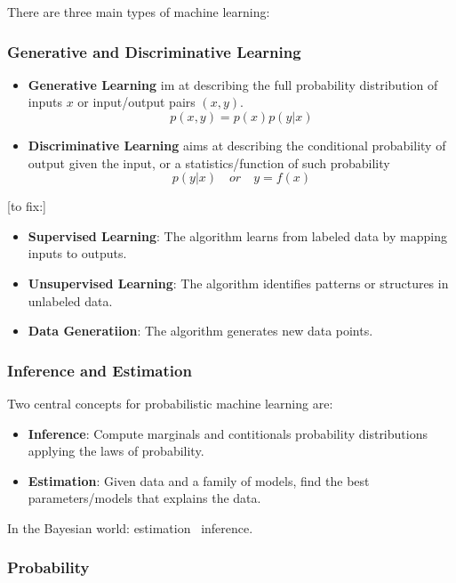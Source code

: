 There are three main types of machine learning:


\subsubsection{Generative and Discriminative Learning}

\begin{itemize}
    \item \textbf{Generative Learning} im at describing the full probability distribution of inputs $x$ or input/output pairs $(x, y)$.
    $$
    p(x,y) = p(x)p(y|x)
    $$

    \item \textbf{Discriminative Learning} aims at describing the conditional probability of output given the input, or a statistics/function of such probability
    $$
    p(y|x) \quad or \quad y = f(x)
    $$
\end{itemize}

[to fix:]
\begin{itemize}
    \item \textbf{Supervised Learning}: The algorithm learns from labeled data by mapping inputs to outputs.
    \item \textbf{Unsupervised Learning}: The algorithm identifies patterns or structures in unlabeled data.
    \item \textbf{Data Generatiion}: The algorithm generates new data points.
\end{itemize}

\subsubsection{Inference and Estimation}

Two central concepts for probabilistic machine learning are:

\begin{itemize}
    \item \textbf{Inference}: Compute marginals and contitionals probability distributions applying the laws of probability. 
    \item \textbf{Estimation}: Given data and a family of models, find the best parameters/models that explains the data.
\end{itemize}

In the Bayesian world: estimation \approx \ inference.

\subsubsection{Probability}

